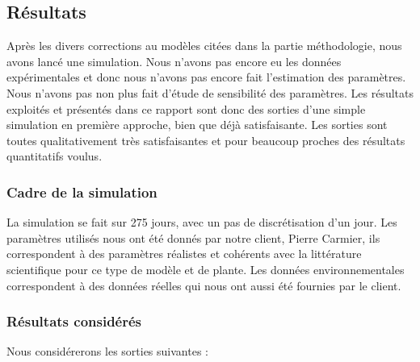 \subsection{Résultats}

Après les divers corrections au modèles citées dans la partie méthodologie, nous avons lancé une simulation. 
Nous n'avons pas encore eu les données expérimentales et donc nous n'avons pas encore fait l'estimation des paramètres. Nous n'avons pas non plus fait d'étude de sensibilité des paramètres. 
Les résultats exploités et présentés dans ce rapport sont donc des sorties d'une simple simulation en première approche, bien que déjà satisfaisante. Les sorties sont toutes qualitativement très satisfaisantes et pour beaucoup proches des résultats quantitatifs voulus. 

\subsubsection{Cadre de la simulation}

La simulation se fait sur 275 jours, avec un pas de discrétisation d'un jour. Les paramètres utilisés nous ont été donnés par notre client, Pierre Carmier, ils correspondent à des paramètres réalistes et cohérents avec la littérature scientifique pour ce type de modèle et de plante. Les données environnementales correspondent à des données réelles qui nous ont aussi été fournies par le client.


\subsubsection{Résultats considérés}

Nous considérerons les sorties suivantes :

